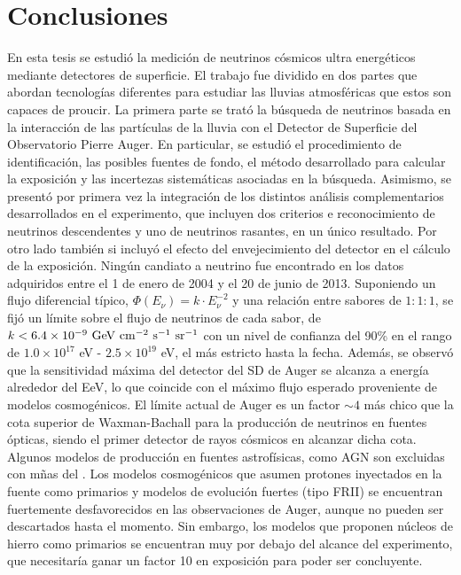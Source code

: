 \chapter{Conclusiones}
\label{ch:concl}

En esta tesis se estudi\'o la medici\'on de neutrinos c\'osmicos ultra energ\'eticos mediante detectores de superficie. 
El trabajo fue dividido en dos partes que abordan tecnolog\'ias diferentes para estudiar las lluvias atmosf\'ericas que estos son capaces de proucir.
La primera parte se trat\'o la b\'usqueda de neutrinos basada en la interacci\'on de las part\'iculas de la lluvia con el Detector de Superficie del Observatorio Pierre Auger.
En particular, se estudi\'o el procedimiento de identificaci\'on, las posibles fuentes de fondo, el m\'etodo desarrollado para calcular la exposici\'on y las incertezas sistem\'aticas asociadas en la b\'usqueda.
Asimismo, se present\'o por primera vez la integraci\'on de los distintos an\'alisis complementarios desarrollados en el experimento, que incluyen dos criterios e reconocimiento de neutrinos descendentes y uno de neutrinos rasantes, en un \'unico resultado.
Por otro lado tambi\'en si incluy\'o el efecto del envejecimiento del detector en el c\'alculo de la exposici\'on.
Ning\'un candiato a neutrino fue encontrado en los datos adquiridos entre el 1 de enero de 2004 y el 20 de junio de 2013. 
Suponiendo un flujo diferencial t\'ipico, $\Phi(E_\nu)= k\cdot E^{-2}_\nu$ y una relaci\'on entre sabores de $1 : 1 : 1$, se fij\'o un l\'imite sobre el flujo de neutrinos de cada sabor, de $k < 6.4 \times 10^{-9}~{\rm GeV~cm^{-2}~s^{-1}~sr^{-1}}$ con un nivel de confianza del 90\% en el rango de ${1.0 \times 10^{17}}$ {eV} - ${2.5 \times 10^{19}}$ {eV}, el m\'as estricto hasta la fecha.
Adem\'as, se observ\'o que la sensitividad m\'axima del detector del SD de Auger se alcanza a energ\'ia alrededor del EeV, lo que coincide con el m\'aximo flujo esperado proveniente de modelos cosmog\'enicos.
El l\'imite actual de Auger es un factor $\sim4$ m\'as chico que la cota superior de Waxman-Bachall para la producci\'on de neutrinos en fuentes \'opticas, siendo el primer detector de rayos c\'osmicos en alcanzar dicha cota.
Algunos modelos de producci\'on en fuentes astrof\'isicas, como AGN son excluidas con m\~nas del .
Los modelos cosmog\'enicos que asumen protones inyectados en la fuente como primarios y modelos de evoluci\'on fuertes (tipo FRII) se encuentran fuertemente desfavorecidos en las observaciones de Auger, aunque no pueden ser descartados hasta el momento.
Sin embargo, los modelos que proponen n\'ucleos de hierro como primarios se encuentran muy por debajo del alcance del experimento, que necesitar\'ia ganar un factor 10 en exposici\'on para poder ser concluyente.

